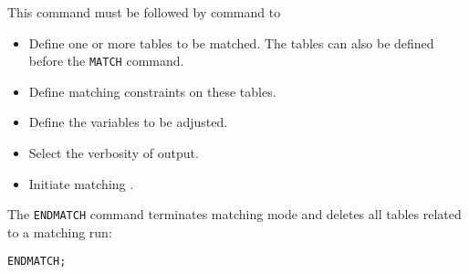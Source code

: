 This command must be followed by command to
\begin{itemize}
\item
  Define one or more tables  to be matched.
  The tables can also be defined before the \texttt{MATCH} command.
\item
  Define matching constraints  on these tables.
\item
  Define the variables  to be adjusted.
\item
  Select the verbosity  of output.
\item
  Initiate matching .
\end{itemize}
The \texttt{ENDMATCH} command terminates matching mode and deletes all
tables related to a matching run:
\begin{verbatim}
ENDMATCH;
\end{verbatim}

